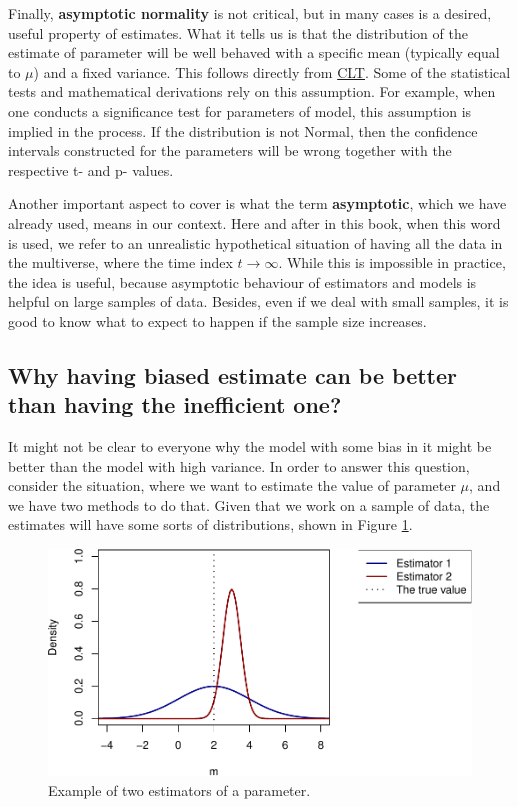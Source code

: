 \documentclass[
]{book}
\theoremstyle{definition}
\theoremstyle{definition}
\theoremstyle{definition}
\theoremstyle{definition}
\theoremstyle{remark}
\begin{document}
Finally, \textbf{asymptotic normality} is not critical, but in many cases is a desired, useful property of estimates. What it tells us is that the distribution of the estimate of parameter will be well behaved with a specific mean (typically equal to \(\mu\)) and a fixed variance. This follows directly from \protect\hyperlink{LLNandCLT}{CLT}. Some of the statistical tests and mathematical derivations rely on this assumption. For example, when one conducts a significance test for parameters of model, this assumption is implied in the process. If the distribution is not Normal, then the confidence intervals constructed for the parameters will be wrong together with the respective t- and p- values.

Another important aspect to cover is what the term \textbf{asymptotic}, which we have already used, means in our context. Here and after in this book, when this word is used, we refer to an unrealistic hypothetical situation of having all the data in the multiverse, where the time index \(t \rightarrow \infty\). While this is impossible in practice, the idea is useful, because asymptotic behaviour of estimators and models is helpful on large samples of data. Besides, even if we deal with small samples, it is good to know what to expect to happen if the sample size increases.

\hypertarget{efficiencyVSBias}{%
\subsection{Why having biased estimate can be better than having the inefficient one?}\label{efficiencyVSBias}}

It might not be clear to everyone why the model with some bias in it might be better than the model with high variance. In order to answer this question, consider the situation, where we want to estimate the value of parameter \(\mu\), and we have two methods to do that. Given that we work on a sample of data, the estimates will have some sorts of distributions, shown in Figure \ref{fig:biasVarianceEstimate}.

\begin{figure}
\centering
\includegraphics{Svetunkov---Statistics-for-Business-Analytics_files/figure-latex/biasVarianceEstimate-1.pdf}
\caption{\label{fig:biasVarianceEstimate}Example of two estimators of a parameter.}
\end{figure}
\end{document}
